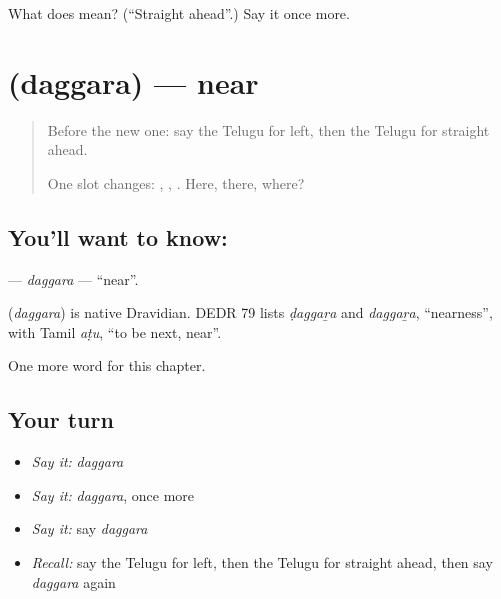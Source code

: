 \begin{tcolorbox}[breakable,colback=teal!4,colframe=teal!35!black,title={Before you move on}]
What does  mean? (\textquotedblleft{}Straight ahead\textquotedblright{}.) Say it once more.
\end{tcolorbox}
\section[\texorpdfstring{\te{దగ్గర} (daggara)}{దగ్గర (daggara)}]{ (daggara) — near}

\label{lesson:TE-C100-daggara}



\begin{quote}
Before the new one: say the Telugu for left, then the Telugu for straight ahead.

One slot changes: \textbf{}, \textbf{}, \textbf{}. Here, there, where?
\end{quote}

\subsection*{You'll want to know: }
\textbf{} — \emph{daggara} — \textquotedblleft{}near\textquotedblright{}.

\begin{cousinweb}
\textbf{} (\emph{daggara}) is native Dravidian. DEDR 79 lists \emph{ḍaggaṟa} and \emph{daggaṟa}, \textquotedblleft{}nearness\textquotedblright{}, with Tamil \emph{aṭu}, \textquotedblleft{}to be next, near\textquotedblright{}.
\end{cousinweb}

\begin{grammarlens}[title={What you've built}]
One more word for this chapter.
\end{grammarlens}

\subsection*{Your turn}
\begin{itemize}
\raggedright
  \item \emph{Say it:} \emph{daggara}
  \item \emph{Say it:} \emph{daggara}, once more
  \item \emph{Say it:} say \emph{daggara}
  \item \emph{Recall:} say the Telugu for left, then the Telugu for straight ahead, then say \emph{daggara} again
\end{itemize}

